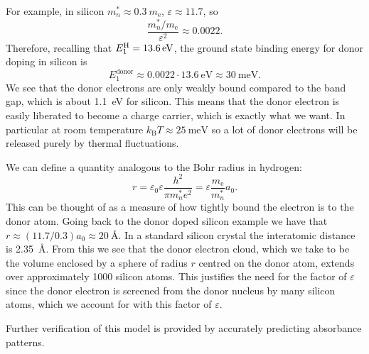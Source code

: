 \documentclass[fleqn]{NotesClass}
\newcommand*{\boltzmann}{k_{\mathrm{B}}}
\newcommand*{\electronmass}{m_{\mathrm{e}}}
\begin{document}
    For example, in silicon \(m_n^* \approx \qty{0.3}{\electronmass}\), \(\varepsilon \approx 11.7\), so
    \begin{equation}
        \frac{m_n^*/m_{\mathrm{e}}}{\varepsilon^2} \approx 0.0022.
    \end{equation}
    Therefore, recalling that \(E_1^{\ce{H}} = \qty{13.6}{\electronvolt}\), the ground state binding energy for donor doping in silicon is
    \begin{equation}
        E_1^{\mathrm{donor}} \approx 0.0022 \cdot \qty{13.6}{\electronvolt} \approx \qty{30}{\milli\electronvolt}.
    \end{equation}
    We see that the donor electrons are only weakly bound compared to the band gap, which is about \qty{1.1}{\electronvolt} for silicon.
    This means that the donor electron is easily liberated to become a charge carrier, which is exactly what we want.
    In particular at room temperature \(\boltzmann T \approx \qty{25}{\milli\electronvolt}\) so a lot of donor electrons will be released purely by thermal fluctuations.
    
    We can define a quantity analogous to the Bohr radius in hydrogen:
    \begin{equation}
        r = \varepsilon_0\varepsilon \frac{h^2}{\pi m_n^*e^2} = \varepsilon\frac{m_{\mathrm{e}}}{m_n^*}a_0.
    \end{equation}
    This can be thought of as a measure of how tightly bound the electron is to the donor atom.
    Going back to the donor doped silicon example we have that \(r \approx (11.7/0.3) a_0 \approx \qty{20}{\angstrom}\).
    In a standard silicon crystal the interatomic distance is \qty{2.35}{\angstrom}.
    From this we see that the donor electron cloud, which we take to be the volume enclosed by a sphere of radius \(r\) centred on the donor atom, extends over approximately 1000 silicon atoms.
    This justifies the need for the factor of \(\varepsilon\) since the donor electron is screened from the donor nucleus by many silicon atoms, which we account for with this factor of \(\varepsilon\).
    
    Further verification of this model is provided by accurately predicting absorbance patterns.
    
    
    
\end{document}
